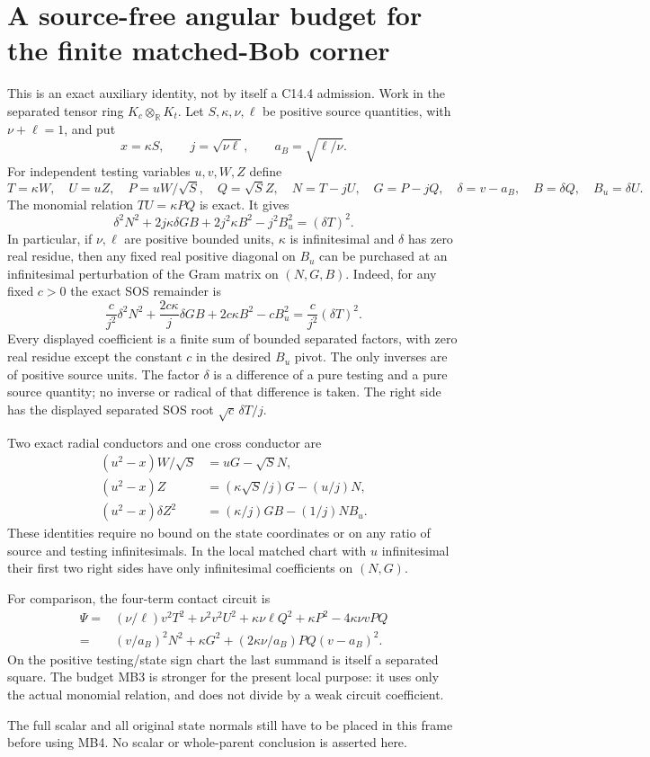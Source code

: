 \section{A source-free angular budget for the finite matched-Bob corner}
\label{sec:new-c144-matched-budget}

This is an exact auxiliary identity, not by itself a C14.4 admission.
Work in the separated tensor ring $K_c\otimes_{\mathbb R}K_t$.
Let $S,\kappa,\nu,\ell$ be positive source quantities, with
$\nu+\ell=1$, and put
\[
 x=\kappa S,\qquad j=\sqrt{\nu\ell},\qquad
 a_B=\sqrt{\ell/\nu}.
 \tag{MB1}
\]
For independent testing variables $u,v,W,Z$ define
\[
 T=\kappa W,\quad U=uZ,\quad P=uW/\sqrt S,\quad Q=\sqrt S Z,
 \quad N=T-jU,\quad G=P-jQ,
 \quad \delta=v-a_B,\quad B=\delta Q,\quad B_u=\delta U.
 \tag{MB2}
\]
The monomial relation $TU=\kappa PQ$ is exact. It gives
\[
 \delta^2N^2+2j\kappa\delta GB+2j^2\kappa B^2-j^2B_u^2
       =(\delta T)^2.
 \tag{MB3}
\]
In particular, if $\nu,\ell$ are positive bounded units,
$\kappa$ is infinitesimal and $\delta$ has zero real residue,
then any fixed real positive diagonal on $B_u$ can be purchased
at an infinitesimal perturbation of the Gram matrix on $(N,G,B)$.
Indeed, for any fixed $c>0$ the exact SOS remainder is
\[
 \frac{c}{j^2}\delta^2N^2+
       \frac{2c\kappa}{j}\delta GB+2c\kappa B^2-cB_u^2
       =\frac{c}{j^2}(\delta T)^2.
 \tag{MB4}
\]
Every displayed coefficient is a finite sum of bounded separated
factors, with zero real residue except the constant $c$ in the
desired $B_u$ pivot. The only inverses are of positive source units.
The factor $\delta$ is a difference of a pure testing and a pure
source quantity; no inverse or radical of that difference is taken.
The right side has the displayed separated SOS root
$\sqrt c\,\delta T/j$.

Two exact radial conductors and one cross conductor are
\[
 \begin{split}
 (u^2-x)W/\sqrt S&=uG-\sqrt S N,\\
 (u^2-x)Z&=(\kappa\sqrt S/j)G-(u/j)N,\\
 (u^2-x)\delta Z^2&=(\kappa/j)GB-(1/j)NB_u.
 \end{split}
 \tag{MB5}
\]
These identities require no bound on the state coordinates or on
any ratio of source and testing infinitesimals. In the local matched
chart with $u$ infinitesimal their first two right sides have only
infinitesimal coefficients on $(N,G)$.

For comparison, the four-term contact circuit is
\[
 \begin{split}
 \Psi={}&(\nu/\ell)v^2T^2+\nu^2v^2U^2
       +\kappa\nu\ell Q^2+\kappa P^2-4\kappa\nu vPQ\\
   ={}&(v/a_B)^2N^2+\kappa G^2
           +(2\kappa\nu/a_B)PQ(v-a_B)^2.
 \end{split}
 \tag{MB6}
\]
On the positive testing/state sign chart the last summand is itself
a separated square. The budget MB3 is stronger for the present local
purpose: it uses only the actual monomial relation, and does not
divide by a weak circuit coefficient.

The full scalar and all original state normals still have to be
placed in this frame before using MB4. No scalar or whole-parent
conclusion is asserted here.

